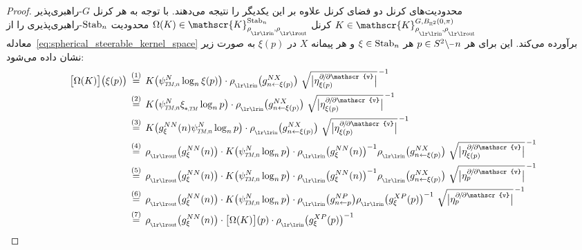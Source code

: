 \begin{proof}
    محدودیت‌های کرنل دو فضای کرنل علاوه بر این یکدیگر را نتیجه می‌دهند.
    با توجه به هر کرنل $G$-راهبری‌پذیر $K \in \mathscr{K}^{G,B_{\R^2}\mkern-1mu(0,\pi)}_{\rhoin\mkern-1mu,\rhoout}$ کرنل $\Omega(K) \in \mathscr{K}^{\Stab{n}}_{\rhoin\mkern-1mu,\rhoout}$ محدودیت $\operatorname{Stab}_{n}$-راهبری‌پذیری را از معادله~\eqref{eq:spherical_steerable_kernel_space} برآورده می‌کند.
    این برای هر $p\in S^2 \backslash \mkern-1mu\minus\mkern1mu n$ هر $\xi \in \operatorname{Stab}_{n}$ و هر پیمانه $X$ در $\xi(p)$ به صورت زیر نشان داده می‌شود:
    \begin{align}
        \big[\Omega(K)\big]\big( \xi(p) \big)
        \,&\overset{(1)}{=}\, K\big( \psiTMn^N \log_n \xi(p) \big) \cdot \rhoin\big( g_{n\leftarrow\xi(p)}^{NX} \big) 
            \ \sqrt{\big|\eta_{\xi(p)}^{\partial\mkern-2mu/\mkern-2mu\partial\mathscr{v}}\big|}^{\,-1} \notag \\
        \,&\overset{(2)}{=}\, K\big( \psiTMn^N \dxiTM \log_n p \big) \cdot \rhoin\big( g_{n\leftarrow\xi(p)}^{NX} \big) 
            \ \sqrt{\big|\eta_{\xi(p)}^{\partial\mkern-2mu/\mkern-2mu\partial\mathscr{v}}\big|}^{\,-1} \notag \\
        \,&\overset{(3)}{=}\, K\big( g_\xi^{NN}(n) \psiTMn^N \log_n p \big) \cdot \rhoin\big( g_{n\leftarrow\xi(p)}^{NX} \big) 
            \ \sqrt{\big|\eta_{\xi(p)}^{\partial\mkern-2mu/\mkern-2mu\partial\mathscr{v}}\big|}^{\,-1} \notag \\
        \,&\overset{(4)}{=}\, \rhoout\big( g_\xi^{NN}(n) \big) \cdot K\big(\psiTMn^N \log_n p \big) \cdot \rhoin\big( g_\xi^{NN}(n) \big)^{-1} \rhoin\big( g_{n\leftarrow\xi(p)}^{NX} \big) 
            \ \sqrt{\big|\eta_{\xi(p)}^{\partial\mkern-2mu/\mkern-2mu\partial\mathscr{v}}\big|}^{\,-1} \notag \\
        \,&\overset{(5)}{=}\, \rhoout\big( g_\xi^{NN}(n) \big) \cdot K\big(\psiTMn^N \log_n p \big) \cdot \rhoin\big( g_\xi^{NN}(n) \big)^{-1} \rhoin\big( g_{n\leftarrow\xi(p)}^{NX} \big)
            \ \sqrt{\big|\eta_p^{\partial\mkern-2mu/\mkern-2mu\partial\mathscr{v}}\big|}^{\,-1} \notag \\
        \,&\overset{(6)}{=}\, \rhoout\big( g_\xi^{NN}(n) \big) \cdot K\big(\psiTMn^N \log_n p \big) \cdot \rhoin\big( g_{n\leftarrow p}^{NP} \big) \rhoin\big( g_\xi^{XP}(p) \big)^{-1} 
            \ \sqrt{\big|\eta_p^{\partial\mkern-2mu/\mkern-2mu\partial\mathscr{v}}\big|}^{\,-1} \notag \\
        \,&\overset{(7)}{=}\, \rhoout\big( g_\xi^{NN}(n) \big) \cdot \big[\Omega(K)\big](p) \cdot \rhoin\big( g_\xi^{XP}(p) \big)^{-1}
    \end{align}

\end{proof}
